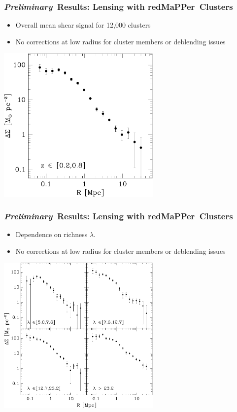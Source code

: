 \documentclass{beamer}
\newcommand{\redmapper}{redMaPPer}
\newcommand{\prelim}{{\bf{\it Preliminary}}}
\begin{document}
\frame
{
    \frametitle{\prelim\ Results: Lensing with \redmapper\ Clusters}

    \begin{itemize}

        \item Overall mean shear signal for 12,000 clusters

        \item No corrections at low radius for cluster members or deblending issues

    \end{itemize}

    \begin{center}
        \includegraphics[width=0.6\textwidth]{run-rm008-bin-zwide-jack.pdf}
    \end{center}

}


\frame
{
    \frametitle{\prelim\ Results: Lensing with \redmapper\ Clusters}

    \begin{itemize}

        \item Dependence on richness $\lambda$.

        \item No corrections at low radius for cluster members or deblending issues

    \end{itemize}


    \begin{center}
        \includegraphics[width=0.6\textwidth]{run-rm008-bin-lbin4-zwide-jack.pdf}
    \end{center}

}
\end{document}

